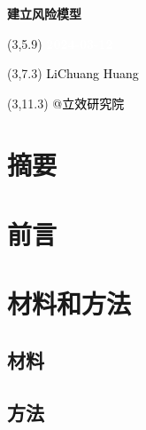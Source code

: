 \documentclass[
]{article}
\author{}
\date{\vspace{-2.5em}}
\begin{document}
\begin{titlepage} 
\begin{center} \textbf{\Huge 建立风险模型}
\vspace{4em} \begin{textblock}{10}(3,5.9) \huge
\textbf{\textcolor{white}{2024-03-12}}
\end{textblock} \begin{textblock}{10}(3,7.3)
\Large \textcolor{black}{LiChuang Huang}
\end{textblock} \begin{textblock}{10}(3,11.3)
\Large \textcolor{black}{@立效研究院}
\end{textblock} \end{center} \end{titlepage}
\restoregeometry


\tableofcontents

\listoffigures

\listoftables

\newpage


\hypertarget{abstract}{%
\section{摘要}\label{abstract}}

\hypertarget{introduction}{%
\section{前言}\label{introduction}}

\hypertarget{methods}{%
\section{材料和方法}\label{methods}}

\hypertarget{ux6750ux6599}{%
\subsection{材料}\label{ux6750ux6599}}

\hypertarget{ux65b9ux6cd5}{%
\subsection{方法}\label{ux65b9ux6cd5}}
\end{document}
